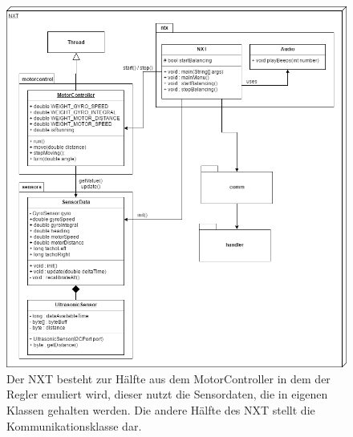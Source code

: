 \documentclass[oneside,abstractoff,a4paper]{scrartcl}
\begin{document}
\begin{figure}
	\includegraphics[width=\textwidth]{NXT.png}
    \caption{Der NXT besteht zur Hälfte aus dem MotorController in dem der Regler emuliert wird, dieser nutzt die Sensordaten, die in eigenen Klassen gehalten werden. Die andere Hälfte des NXT stellt die Kommunikationsklasse dar.}
    \label{fig:NXT}
\end{figure}
\end{document}
